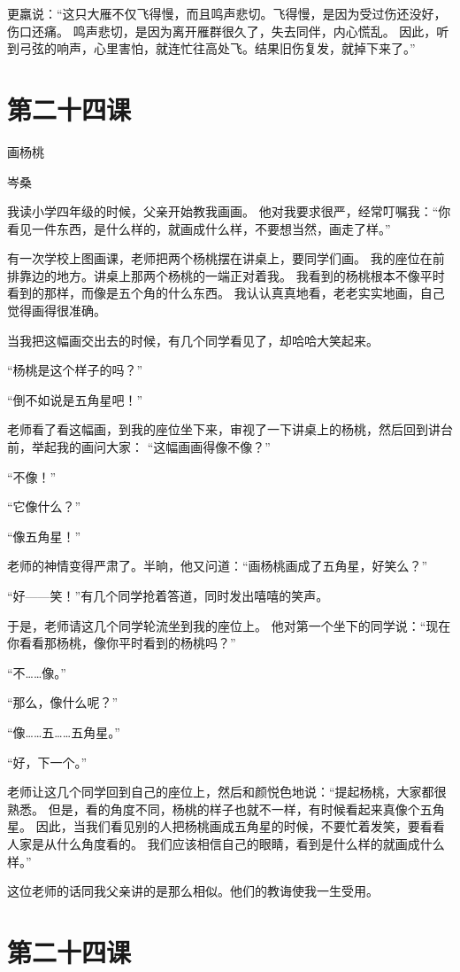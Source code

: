 \documentclass[12pt,UTF8]{ctexbook}
\begin{document}
更羸说：“这只大雁不仅飞得慢，而且鸣声悲切。飞得慢，是因为受过伤还没好，伤口还痛。
鸣声悲切，是因为离开雁群很久了，失去同伴，内心慌乱。
因此，听到弓弦的响声，心里害怕，就连忙往高处飞。结果旧伤复发，就掉下来了。”

\section{第二十四课}

画杨桃

岑桑

我读小学四年级的时候，父亲开始教我画画。
他对我要求很严，经常叮嘱我：“你看见一件东西，是什么样的，就画成什么样，不要想当然，画走了样。”

有一次学校上图画课，老师把两个杨桃摆在讲桌上，要同学们画。
我的座位在前排靠边的地方。讲桌上那两个杨桃的一端正对着我。
我看到的杨桃根本不像平时看到的那样，而像是五个角的什么东西。
我认认真真地看，老老实实地画，自己觉得画得很准确。

当我把这幅画交出去的时候，有几个同学看见了，却哈哈大笑起来。

“杨桃是这个样子的吗？”

“倒不如说是五角星吧！”

老师看了看这幅画，到我的座位坐下来，审视了一下讲桌上的杨桃，然后回到讲台前，举起我的画问大家：
“这幅画画得像不像？”

“不像！”

“它像什么？”

“像五角星！”

老师的神情变得严肃了。半晌，他又问道：“画杨桃画成了五角星，好笑么？”

“好——笑！”有几个同学抢着答道，同时发出嘻嘻的笑声。

于是，老师请这几个同学轮流坐到我的座位上。
他对第一个坐下的同学说：“现在你看看那杨桃，像你平时看到的杨桃吗？”

“不……像。”

“那么，像什么呢？”

“像……五……五角星。”

“好，下一个。”

老师让这几个同学回到自己的座位上，然后和颜悦色地说：“提起杨桃，大家都很熟悉。
但是，看的角度不同，杨桃的样子也就不一样，有时候看起来真像个五角星。
因此，当我们看见别的人把杨桃画成五角星的时候，不要忙着发笑，要看看人家是从什么角度看的。
我们应该相信自己的眼睛，看到是什么样的就画成什么样。”

这位老师的话同我父亲讲的是那么相似。他们的教诲使我一生受用。

\section{第二十四课}
\end{document}
